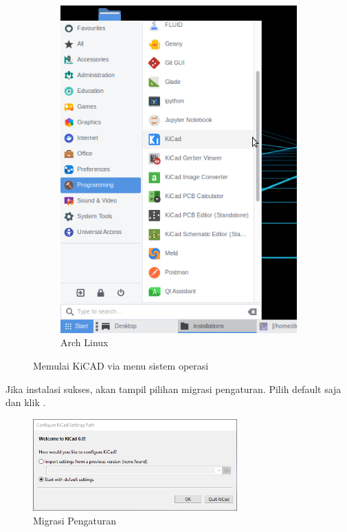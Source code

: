 \documentclass[12pt]{book}
\begin{document}
\begin{figure}[!ht]
\begin{subfigure}[t]{0.4\textwidth}
			\includegraphics[width=\textwidth]{images/installations/kicad_menu_linux}
			\caption{Arch Linux}
		\end{subfigure}
		\caption{Memulai KiCAD via menu sistem operasi}
	\end{figure}

	Jika instalasi sukses, akan tampil pilihan migrasi pengaturan.
	Pilih default saja dan klik .

	\begin{figure}[!ht]
		\centering
		\includegraphics[width=0.7\textwidth]{images/installations/kicad_welcome}
		\caption{Migrasi Pengaturan}
	\end{figure}
\end{document}
